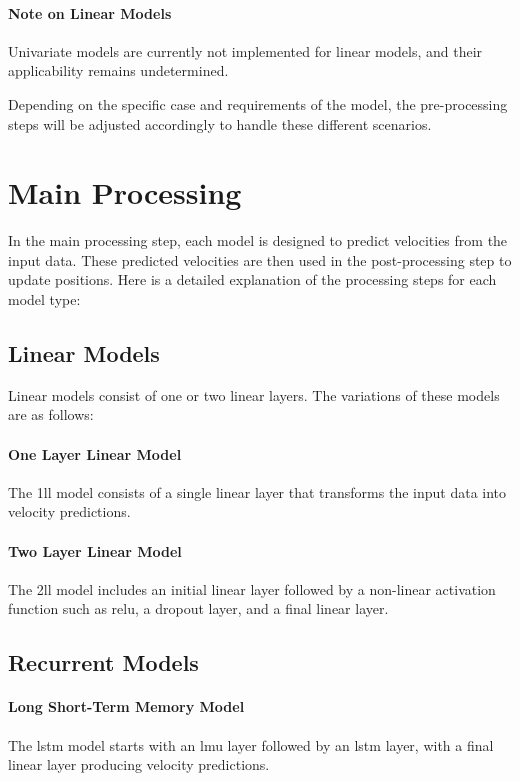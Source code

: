 \paragraph{Note on Linear Models}
Univariate models are currently not implemented for linear models, and their applicability remains undetermined.


Depending on the specific case and requirements of the model, the pre-processing steps will be adjusted accordingly to handle these different scenarios.

\section{Main Processing}
\label{sec:main_proc}
In the main processing step, each model is designed to predict velocities from the input data. These predicted velocities are then used in the post-processing step to update positions. Here is a detailed explanation of the processing steps for each model type:

\subsection{Linear Models}
Linear models consist of one or two linear layers. The variations of these models are as follows:

\paragraph{One Layer Linear Model}
The \gls{1ll} model consists of a single linear layer that transforms the input data into velocity predictions.

\paragraph{Two Layer Linear Model}
The \gls{2ll} model includes an initial linear layer followed by a non-linear activation function such as \gls{relu}, a dropout layer, and a final linear layer.

\subsection{Recurrent Models}

\paragraph{Long Short-Term Memory Model}
The \gls{lstm} model starts with an \gls{lmu} layer followed by an \gls{lstm} layer, with a final linear layer producing velocity predictions.

